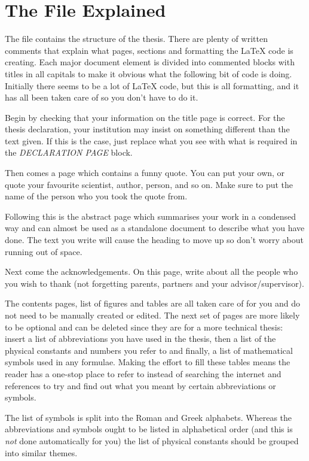 \section{The  File Explained}

The  file contains the structure of the thesis. There are plenty of written comments that explain what pages, sections and formatting the \LaTeX{} code is creating. Each major document element is divided into commented blocks with titles in all capitals to make it obvious what the following bit of code is doing. Initially there seems to be a lot of \LaTeX{} code, but this is all formatting, and it has all been taken care of so you don't have to do it.

Begin by checking that your information on the title page is correct. For the thesis declaration, your institution may insist on something different than the text given. If this is the case, just replace what you see with what is required in the \emph{DECLARATION PAGE} block.

Then comes a page which contains a funny quote. You can put your own, or quote your favourite scientist, author, person, and so on. Make sure to put the name of the person who you took the quote from.

Following this is the abstract page which summarises your work in a condensed way and can almost be used as a standalone document to describe what you have done. The text you write will cause the heading to move up so don't worry about running out of space.

Next come the acknowledgements. On this page, write about all the people who you wish to thank (not forgetting parents, partners and your advisor/supervisor).

The contents pages, list of figures and tables are all taken care of for you and do not need to be manually created or edited. The next set of pages are more likely to be optional and can be deleted since they are for a more technical thesis: insert a list of abbreviations you have used in the thesis, then a list of the physical constants and numbers you refer to and finally, a list of mathematical symbols used in any formulae. Making the effort to fill these tables means the reader has a one-stop place to refer to instead of searching the internet and references to try and find out what you meant by certain abbreviations or symbols.

The list of symbols is split into the Roman and Greek alphabets. Whereas the abbreviations and symbols ought to be listed in alphabetical order (and this is \emph{not} done automatically for you) the list of physical constants should be grouped into similar themes.

